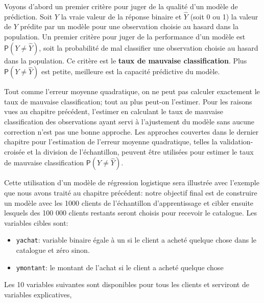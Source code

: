 \documentclass[
  11pt,
  letterpaper,
]{book}
\providecommand{\tightlist}{%
  \setlength{\itemsep}{0pt}\setlength{\parskip}{0pt}}
\theoremstyle{definition}
\theoremstyle{definition}
\theoremstyle{definition}
\theoremstyle{remark}
\begin{document}
Voyons d'abord un premier critère pour juger de la qualité d'un modèle de prédiction. Soit \(Y\) la vraie valeur de la réponse binaire et \(\widehat{Y}\) (soit 0 ou 1) la valeur de \(Y\) prédite par un modèle pour une observation choisie au hasard dans la population. Un premier critère pour juger de la performance d'un modèle est \({\mathsf P}\left(Y \neq\widehat{Y}\right)\), soit la probabilité de mal classifier une observation choisie au hasard dans
la population. Ce critère est le \textbf{taux de mauvaise classification}. Plus \({\mathsf P}\left(Y \neq\widehat{Y}\right)\) est petite, meilleure est la capacité prédictive du modèle.

Tout comme l'erreur moyenne quadratique, on ne peut pas calculer exactement le taux de mauvaise classification; tout au plus peut-on l'estimer. Pour les raisons vues au chapitre précédent, l'estimer en
calculant le taux de mauvaise classification des observations ayant servi à
l'ajustement du modèle sans aucune correction n'est pas une bonne approche.
Les approches couvertes dans le dernier chapitre pour l'estimation de l'erreur moyenne quadratique, telles la validation-croisée et la
division de l'échantillon, peuvent être utilisées pour estimer le taux de mauvaise classification \({\mathsf P}\left(Y \neq \widehat{Y}\right)\).

Cette utilisation d'un modèle de régression logistique sera illustrée avec l'exemple que nous avons traité au chapitre précédent: notre objectif final est de construire un modèle avec les 1000 clients de l'échantillon d'apprentissage et cibler ensuite lesquels des 100 000 clients restants seront choisis pour recevoir le catalogue. Les variables cibles sont:

\begin{itemize}
\tightlist
\item
  \texttt{yachat}: variable binaire égale à un si le client a acheté quelque chose dans le catalogue et zéro sinon.
\item
  \texttt{ymontant}: le montant de l'achat si le client a acheté quelque chose
\end{itemize}

Les 10 variables suivantes sont disponibles pour tous les clients et serviront de variables explicatives,
\end{document}
